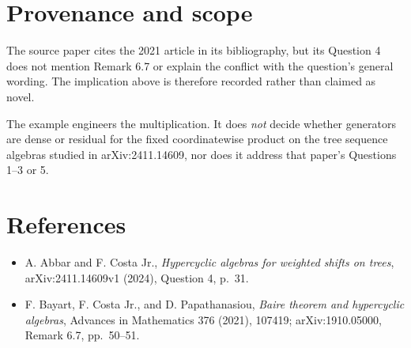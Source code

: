 \documentclass[11pt]{article}
\begin{document}
\section{Provenance and scope}

The source paper cites the 2021 article in its bibliography, but its Question
4 does not mention Remark 6.7 or explain the conflict with the question's
general wording.  The implication above is therefore recorded rather than
claimed as novel.

The example engineers the multiplication.  It does \emph{not} decide whether
generators are dense or residual for the fixed coordinatewise product on the
tree sequence algebras studied in arXiv:2411.14609, nor does it address that
paper's Questions 1--3 or 5.

\section{References}

\begin{itemize}[leftmargin=*]
\item A. Abbar and F. Costa Jr., \emph{Hypercyclic algebras for weighted
shifts on trees}, arXiv:2411.14609v1 (2024), Question 4, p.~31.
\item F. Bayart, F. Costa Jr., and D. Papathanasiou, \emph{Baire theorem and
hypercyclic algebras}, Advances in Mathematics 376 (2021), 107419;
arXiv:1910.05000, Remark 6.7, pp.~50--51.
\end{itemize}
\end{document}
